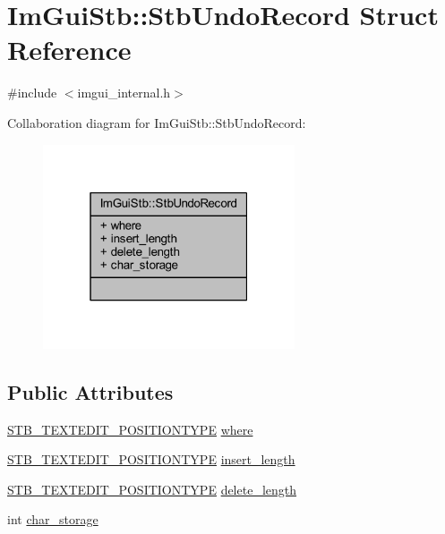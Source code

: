 \hypertarget{struct_im_gui_stb_1_1_stb_undo_record}{}\section{Im\+Gui\+Stb\+:\+:Stb\+Undo\+Record Struct Reference}
\label{struct_im_gui_stb_1_1_stb_undo_record}


{\ttfamily \#include $<$imgui\+\_\+internal.\+h$>$}



Collaboration diagram for Im\+Gui\+Stb\+:\+:Stb\+Undo\+Record\+:
\nopagebreak
\begin{figure}[H]
\begin{center}
\leavevmode
\includegraphics[width=211pt]{struct_im_gui_stb_1_1_stb_undo_record__coll__graph}
\end{center}
\end{figure}
\subsection*{Public Attributes}
\begin{DoxyCompactItemize}
\item 
\mbox{\hyperlink{imstb__textedit_8h_a5d0c1b8751b6517e3d817f2a025ed654}{S\+T\+B\+\_\+\+T\+E\+X\+T\+E\+D\+I\+T\+\_\+\+P\+O\+S\+I\+T\+I\+O\+N\+T\+Y\+PE}} \mbox{\hyperlink{struct_im_gui_stb_1_1_stb_undo_record_acd3cbeaa50d642520c1a317c7d89a47b}{where}}
\item 
\mbox{\hyperlink{imstb__textedit_8h_a5d0c1b8751b6517e3d817f2a025ed654}{S\+T\+B\+\_\+\+T\+E\+X\+T\+E\+D\+I\+T\+\_\+\+P\+O\+S\+I\+T\+I\+O\+N\+T\+Y\+PE}} \mbox{\hyperlink{struct_im_gui_stb_1_1_stb_undo_record_a6f1fc461dd780185bfb7dac656a8b098}{insert\+\_\+length}}
\item 
\mbox{\hyperlink{imstb__textedit_8h_a5d0c1b8751b6517e3d817f2a025ed654}{S\+T\+B\+\_\+\+T\+E\+X\+T\+E\+D\+I\+T\+\_\+\+P\+O\+S\+I\+T\+I\+O\+N\+T\+Y\+PE}} \mbox{\hyperlink{struct_im_gui_stb_1_1_stb_undo_record_a7756b0c504a971d8039ce64128d15b11}{delete\+\_\+length}}
\item 
int \mbox{\hyperlink{struct_im_gui_stb_1_1_stb_undo_record_ad9258297aa433053d616484d8e6ea0be}{char\+\_\+storage}}
\end{DoxyCompactItemize}


